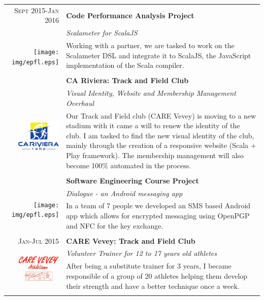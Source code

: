 \documentclass[a4paper,11pt]{article} %
\begin{document}
\begin{tabularx}{\textwidth}{r|X}


\textsc{Sept 2015-Jan 2016} & \textbf{Code Performance Analysis Project} \\
\multirow{4}{*}{ \texttt{[image: img/epfl.eps]}}
& \emph{Scalameter for ScalaJS}\\ 
& \footnotesize{Working with a partner, we are tasked to work on the Scalameter DSL and integrate it to ScalaJS,
the JavaScript implementation of the Scala compiler.}\\
\multicolumn{2}{c}{} \\


\textsc{Mai 2015-Jan 2016} & \textbf{CA Riviera: Track and Field Club} \\
\multirow{4}{*}{ \includegraphics[width=60pt]{img/cariviera.eps}}
& \emph{Visual Identity, Website and Membership Management Overhaul}\\ 
& \footnotesize{Our Track and Field club (CARE Vevey) is moving to a new stadium with it came a will to renew the identity of the club.
I am tasked to find the new visual identity of the club, mainly through the creation of a responsive website (Scala + Play framework).
The membership management will also become 100\% automated in the process.}\\
\multicolumn{2}{c}{} \\


\textsc{Sept-Dec 2014} & \textbf{Software Engineering Course Project} \\
\multirow{2}{*}{ \texttt{[image: img/epfl.eps]}}
& \emph{Dialogue - an Android messaging app}\\ 
& \footnotesize{In a team of 7 people we developed an SMS based Android app which allows for encrypted messaging using OpenPGP
and NFC for the key exchange.}\\
\multicolumn{2}{c}{} \\


\textsc{Jan-Jul 2015} & \textbf{CARE Vevey: Track and Field Club} \\
\multirow{2}{*}{ \includegraphics[width=60pt]{img/care.png}}
& \emph{Volunteer Trainer for 12 to 17 years old athletes}\\ 
& \footnotesize{After being a substitute trainer for 3 years, I became responsible of a group of 20 athletes helping them develop their strength
and have a better technique once a week.}\\
\multicolumn{2}{c}{} \\


\end{tabularx}
\end{document}
